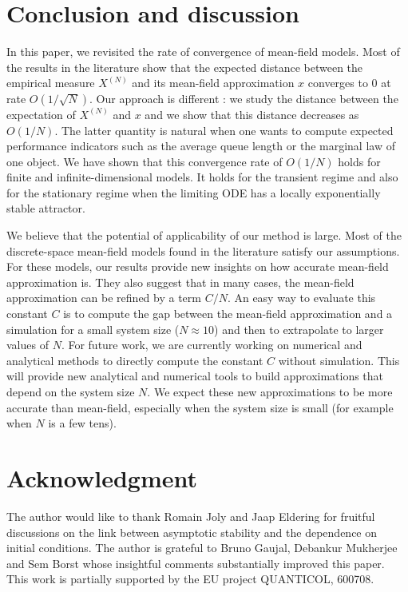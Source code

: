\documentclass[sigconf]{acmart}
\newcommand\XN{X^{(N)}}
\begin{document}
\section{Conclusion and discussion}
\label{sec:conclusion}

In this paper, we revisited the rate of convergence of mean-field
models. Most of the results in the literature show that the expected
distance between the empirical measure $\XN$ and its mean-field
approximation $x$ converges to $0$ at rate $O(1/\sqrt{N})$. Our
approach is different : we study the distance between the expectation
of $\XN$ and $x$ and we show that this distance decreases as
$O(1/N)$. The latter quantity is natural when one wants to compute
expected performance indicators such as the average queue length or
the marginal law of one object.  We have shown that this convergence
rate of $O(1/N)$ holds for finite and infinite-dimensional models. It
holds for the transient regime and also for the stationary regime when
the limiting ODE has a locally exponentially stable attractor.

We believe that the potential of applicability of our method is
large. Most of the discrete-space mean-field models found in the
literature satisfy our assumptions.  For these models, our results
provide new insights on how accurate mean-field approximation is. They
also suggest that in many cases, the mean-field approximation can be
refined by a term $C/N$.  An easy way to evaluate this constant $C$ is
to compute the gap between the mean-field approximation and a
simulation for a small system size ($N\approx10$) and then to
extrapolate to larger values of $N$.  For future work, we are
currently working on numerical and analytical methods to directly
compute the constant $C$ without simulation.  This will provide new
analytical and numerical tools to build approximations that depend on
the system size $N$. We expect these new approximations to be more
accurate than mean-field, especially when the system size is small
(for example when $N$ is a few tens).

\section{Acknowledgment}

The author would like to thank Romain Joly and Jaap Eldering for
fruitful discussions on the link between asymptotic stability and the
dependence on initial conditions. The author is grateful to Bruno
Gaujal, Debankur Mukherjee and Sem Borst whose insightful comments
substantially improved this paper.  This work is partially supported
by the EU project QUANTICOL, 600708.



\end{document}
